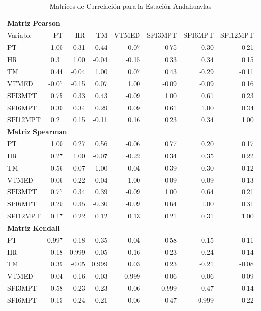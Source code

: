 \begin{table}[H]
\centering
\caption{Matrices de Correlación para la Estación Andahuaylas}
\begin{tabular}{lrrrrrrr}
\toprule
\multicolumn{8}{l}{\textbf{Matriz Pearson}} \\
\midrule
Variable & PT & HR & TM & VTMED & SPI3MPT & SPI6MPT & SPI12MPT \\
\midrule
PT       & 1.00 & 0.31 & 0.44 & -0.07 & 0.75 & 0.30 & 0.21 \\
HR       & 0.31 & 1.00 & -0.04 & -0.15 & 0.33 & 0.34 & 0.15 \\
TM       & 0.44 & -0.04 & 1.00 & 0.07 & 0.43 & -0.29 & -0.11 \\
VTMED    & -0.07 & -0.15 & 0.07 & 1.00 & -0.09 & -0.09 & 0.16 \\
SPI3MPT  & 0.75 & 0.33 & 0.43 & -0.09 & 1.00 & 0.61 & 0.23 \\
SPI6MPT  & 0.30 & 0.34 & -0.29 & -0.09 & 0.61 & 1.00 & 0.34 \\
SPI12MPT & 0.21 & 0.15 & -0.11 & 0.16 & 0.23 & 0.34 & 1.00 \\
\midrule
\multicolumn{8}{l}{\textbf{Matriz Spearman}} \\
\midrule
PT       & 1.00 & 0.27 & 0.56 & -0.06 & 0.77 & 0.20 & 0.17 \\
HR       & 0.27 & 1.00 & -0.07 & -0.22 & 0.34 & 0.35 & 0.22 \\
TM       & 0.56 & -0.07 & 1.00 & 0.04 & 0.39 & -0.30 & -0.12 \\
VTMED    & -0.06 & -0.22 & 0.04 & 1.00 & -0.09 & -0.09 & 0.13 \\
SPI3MPT  & 0.77 & 0.34 & 0.39 & -0.09 & 1.00 & 0.64 & 0.21 \\
SPI6MPT  & 0.20 & 0.35 & -0.30 & -0.09 & 0.64 & 1.00 & 0.31 \\
SPI12MPT & 0.17 & 0.22 & -0.12 & 0.13 & 0.21 & 0.31 & 1.00 \\
\midrule
\multicolumn{8}{l}{\textbf{Matriz Kendall}} \\
\midrule
PT       & 0.997 & 0.18 & 0.35 & -0.04 & 0.58 & 0.15 & 0.11 \\
HR       & 0.18 & 0.999 & -0.05 & -0.16 & 0.23 & 0.24 & 0.14 \\
TM       & 0.35 & -0.05 & 0.999 & 0.03 & 0.23 & -0.21 & -0.08 \\
VTMED    & -0.04 & -0.16 & 0.03 & 0.999 & -0.06 & -0.06 & 0.09 \\
SPI3MPT  & 0.58 & 0.23 & 0.23 & -0.06 & 0.999 & 0.47 & 0.14 \\
SPI6MPT  & 0.15 & 0.24 & -0.21 & -0.06 & 0.47 & 0.999 & 0.22 \\

\end{tabular}
\end{table}
